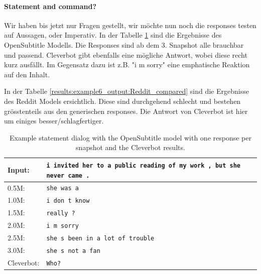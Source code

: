 \paragraph{Statement and command?} Wir haben bis jetzt nur Fragen gestellt, wir möchte nun noch die responses testen auf Aussagen, oder Imperativ. In der Tabelle \ref{results:example6_output:OpenSubtitle_compared} sind die Ergebnisse des OpenSubtitle Modells. Die Responses sind ab dem 3. Snapshot alle brauchbar und passend. Cleverbot gibt ebenfalls eine mögliche Antwort, wobei diese recht kurz ausfällt. Im Gegensatz dazu ist z.B. "i m sorry" eine emphatische Reaktion auf den Inhalt.

In der Tabelle \ref{results:example6_output:Reddit_compared} sind die Ergebnisse des Reddit Models ersichtlich. Diese sind durchgehend schlecht und bestehen grösstenteils aus den generischen responses. Die Antwort von Cleverbot ist hier um einiges besser/schlagfertiger.
\begin{table}[H]
	\centering
	\begin{adjustbox}{max width=\textwidth}
		\begin{tabular}{ll}
			\toprule
			Input: 	& \texttt{i invited her to a public reading of my work , but she never came .}\\
			\midrule
			0.5M: 	& \texttt{she was a}\\
			1.0M: 	& \texttt{i don t know}\\
			1.5M:	& \texttt{really ?}\\
			2.0M:	& \texttt{i m sorry}\\
			2.5M:	& \texttt{she s been in a lot of trouble}\\
			3.0M:	& \texttt{she s not a fan}\\
			Cleverbot:	& \texttt{Who?}\\
			\bottomrule
		\end{tabular}
	\end{adjustbox}
	\caption{Example statement dialog with the OpenSubtitle model with one response per snapshot and the Cleverbot results.}
	\label{results:example6_output:OpenSubtitle_compared}
\end{table}

